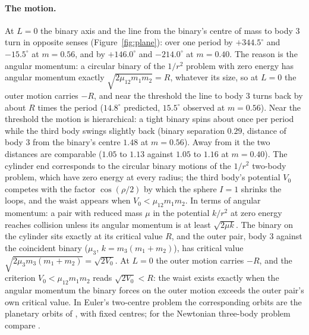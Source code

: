\documentclass[11pt]{article}
\theoremstyle{definition}
\begin{document}
\paragraph{The motion.} At $L=0$ the binary axis and the line from the binary's centre of mass to body $3$ turn in
opposite senses (Figure~\ref{fig:plane}): over one period by $+344.5^\circ$ and $-15.5^\circ$ at $m=0.56$, and by
$+146.0^\circ$ and $-214.0^\circ$ at $m=0.40$. The reason is the angular momentum: a circular binary of the $1/r^2$
problem with zero energy has angular momentum exactly $\sqrt{2\mu_{12}m_1m_2}=R$, whatever its size, so at $L=0$ the
outer motion carries $-R$, and near the threshold the line to body $3$ turns back by about $R$ times the period
($14.8^\circ$ predicted, $15.5^\circ$ observed at $m=0.56$). Near the threshold the motion is hierarchical: a tight binary spins about
once per period while the third body swings slightly back (binary separation $0.29$, distance of body $3$ from the
binary's centre $1.48$ at $m=0.56$). Away from it the two distances are comparable ($1.05$ to $1.13$ against $1.05$ to
$1.16$ at $m=0.40$). The cylinder end corresponds to the circular binary motions of the $1/r^2$ two-body problem, which
have zero energy at every radius; the third body's potential $V_0$ competes with the factor $\cos(\rho/2)$ by which the
sphere $I=1$ shrinks the loops, and the waist appears when $V_0<\mu_{12}m_1m_2$. In terms of angular momentum: a pair
with reduced mass $\mu$ in the potential $k/r^2$ at zero energy reaches collision unless its angular momentum is at
least $\sqrt{2\mu k}$.
The binary on the cylinder sits exactly at its critical value $R$, and the outer pair, body $3$ against the coincident
binary ($\mu_3$, $k=m_3(m_1+m_2)$), has critical value $\sqrt{2\mu_3m_3(m_1+m_2)}=\sqrt{2V_0}$. At $L=0$ the outer motion
carries $-R$, and the criterion $V_0<\mu_{12}m_1m_2$ reads $\sqrt{2V_0}<R$: the waist exists exactly when the angular
momentum the binary forces on the outer motion exceeds the outer pair's own critical value. In Euler's two-centre problem the
corresponding orbits are the planetary orbits of \cite{DM16}, with fixed centres; for the Newtonian three-body problem
compare \cite[open question 6]{MM15}.
\end{document}
